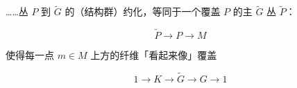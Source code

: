 

……丛 $P$ 到 $\widetilde{G}$ 的（结构群）约化，等同于一个覆盖 $P$ 的主 $\widetilde{G}$ 丛 $\widetilde{P}$：

\begin{equation}
  \widetilde{P} \to P \to M
  \tag{G.3}
  \label{eq:G.3}
\end{equation}

使得每一点 $m\in M$ 上方的纤维「看起来像」覆盖

\begin{equation}
  1 \to K \to \widetilde{G} \to G \to 1
  \tag{G.4}
  \label{eq:G.4}
\end{equation}

